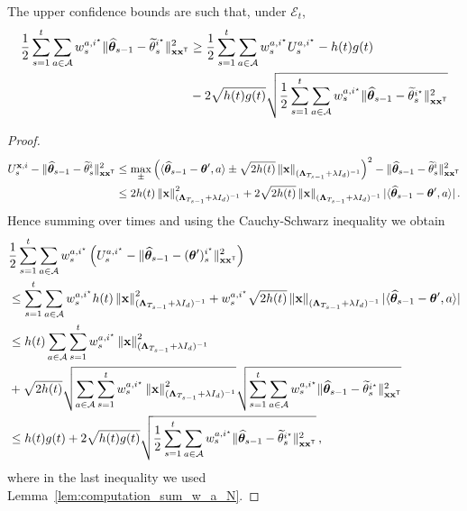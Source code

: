 \begin{lemma}
The upper confidence bounds are such that, under $\mathcal E_t$,
\begin{align*}
    \frac{1}{2}\sum_{s=1}^t \sum_{a\in\mathcal{A}} w_s^{a,i^\star}\Vert \widehat{{\boldsymbol \theta}}_{s-1} - \widetilde{\bf \theta}_s^{i^\star}\Vert_{{\bf x}{\bf x}^\mathsf{\scriptscriptstyle T}}^2\label{eq:only_istar}
    &\ge \frac{1}{2}\sum_{s=1}^t\sum_{a\in\mathcal{A}} w_s^{a,i^\star}U_s^{a,i^\star} - h(t)g(t)\\ 
    &-2\sqrt{ h(t) g(t)}  \sqrt{\frac{1}{2}\sum_{s=1}^t \sum_{a\in\mathcal{A}} w_s^{a,i^\star}\Vert \widehat{{\boldsymbol \theta}}_{s-1} - \widetilde{\bf \theta}_s^{i^\star} \Vert_{{\bf x}{\bf x}^\mathsf{\scriptscriptstyle T}}^2}
\end{align*}
\end{lemma}
\begin{proof}
\begin{align*}
U_s^{{\bf x},i} -\Vert \widehat{{\boldsymbol \theta}}_{s-1} - \widetilde{\bf \theta}_s^i\Vert_{{\bf x}{\bf x}^\mathsf{\scriptscriptstyle T}}^2
&\leq   \max_\pm \left( \langle \widehat{{\boldsymbol \theta}}_{s-1} - {\boldsymbol \theta}',a\rangle \pm \sqrt{2 h(t)} \left\lVert{\bf x}\right\rVert_{({\boldsymbol \Lambda}_{T_{s-1}}+ \lambda I_d)^{-1}} \right)^2-\Vert \widehat{{\boldsymbol \theta}}_{s-1} - \widetilde{\bf \theta}_s^i\Vert_{{\bf x}{\bf x}^\mathsf{\scriptscriptstyle T}}^2\\
&\leq  2h(t)\left\lVert{\bf x}\right\rVert^2_{({\boldsymbol \Lambda}_{T_{s-1}}+ \lambda I_d)^{-1}} + 2\sqrt{2 h(t)} \left\lVert{\bf x}\right\rVert_{({\boldsymbol \Lambda}_{T_{s-1}}+ \lambda I_d)^{-1}}| \langle \widehat{{\boldsymbol \theta}}_{s-1} - {\boldsymbol \theta}',a\rangle|\,.\\
\end{align*}
Hence summing over times and using the Cauchy-Schwarz inequality we obtain
\begin{align*}
&\frac{1}{2}\sum_{s=1}^t\sum_{a\in\mathcal{A}} w_s^{a,i^\star}\left(U_s^{a,i^\star} -\Vert \widehat{{\boldsymbol \theta}}_{s-1} - ({\boldsymbol \theta}')_s^{i^\star}\Vert_{{\bf x}{\bf x}^\mathsf{\scriptscriptstyle T}}^2\right)
\\
&\le \sum_{s=1}^t \sum_{a\in\mathcal{A}} w_s^{a,i^\star}h(t)\left\lVert{\bf x}\right\rVert^2_{({\boldsymbol \Lambda}_{T_{s-1}}+ \lambda I_d)^{-1}} +w_s^{a,i^\star} \sqrt{2 h(t)} \left\lVert{\bf x}\right\rVert_{({\boldsymbol \Lambda}_{T_{s-1}}+ \lambda I_d)^{-1}}| \langle \widehat{{\boldsymbol \theta}}_{s-1} - {\boldsymbol \theta}',a\rangle|
\\
&\le  h(t) \sum_{a\in\mathcal{A}} \sum_{s=1}^t w_s^{a,i^\star}\left\lVert{\bf x}\right\rVert^2_{({\boldsymbol \Lambda}_{T_{s-1}}+ \lambda I_d)^{-1}}\\
&+ \sqrt{2 h(t)} \sqrt{\sum_{a\in\mathcal{A}} \sum_{s=1}^t w_s^{a,i^\star}\left\lVert{\bf x}\right\rVert^2_{({\boldsymbol \Lambda}_{T_{s-1}}+ \lambda I_d)^{-1}}}  \sqrt{\sum_{s=1}^t \sum_{a\in\mathcal{A}} w_s^{a,i^\star}\Vert \widehat{{\boldsymbol \theta}}_{s-1} - \widetilde{\bf \theta}_s^{i^\star} \Vert_{{\bf x}{\bf x}^\mathsf{\scriptscriptstyle T}}^2} \\
&\leq h(t)g(t) +2\sqrt{ h(t) g(t)}  \sqrt{\frac{1}{2}\sum_{s=1}^t \sum_{a\in\mathcal{A}} w_s^{a,i^\star}\Vert \widehat{{\boldsymbol \theta}}_{s-1} - \widetilde{\bf \theta}_s^{i^\star} \Vert_{{\bf x}{\bf x}^\mathsf{\scriptscriptstyle T}}^2}\,,
\end{align*}
where in the last inequality we used Lemma~\ref{lem:computation_sum_w_a_N}.
\end{proof}

